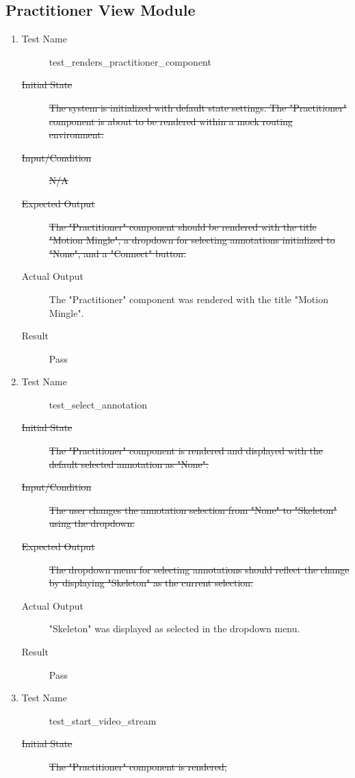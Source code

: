 \documentclass[12pt, titlepage]{article}
\begin{document}
\subsection{Practitioner View Module}
\begin{enumerate}[UT-PV1]
\item \label{UT-PV1}
  \begin{description}
  \item[Test Name] test\_renders\_practitioner\_component
  \item[\sout{Initial State}] \sout{The system is initialized with default state
      settings. The "Practitioner" component is about to be rendered within a
      mock routing environment.}
  \item[\sout{Input/Condition}] \sout{N/A}
  \item[\sout{Expected Output}] \sout{The "Practitioner" component should be
      rendered with the title "Motion Mingle", a dropdown for selecting
      annotations initialized to "None", and a "Connect" button.}
  \item[Actual Output] The "Practitioner" component was rendered with the title
    "Motion Mingle".
  \item[Result] Pass
  \end{description}
\item \label{UT-PV2}
  \begin{description}
  \item[Test Name] test\_select\_annotation
  \item[\sout{Initial State}] \sout{The "Practitioner" component is rendered and
      displayed with the default selected annotation as "None".}
  \item[\sout{Input/Condition}] \sout{The user changes the annotation selection
      from "None" to "Skeleton" using the dropdown.}
  \item[\sout{Expected Output}] \sout{The dropdown menu for selecting annotations
      should reflect the change by displaying "Skeleton" as the current
      selection.}
  \item[Actual Output] "Skeleton" was displayed as selected in the dropdown
    menu.
  \item[Result] Pass
  \end{description}
\item \label{UT-PV3}
  \begin{description}
  \item[Test Name] test\_start\_video\_stream
  \item[\sout{Initial State}] \sout{The "Practitioner" component is rendered,
}
\end{description}
\end{enumerate}
\end{document}
